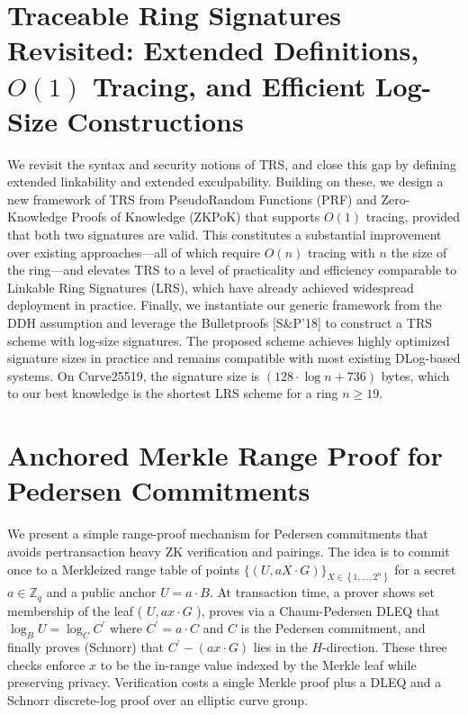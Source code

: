 \documentclass[11pt,oneside]{book}
\theoremstyle{definition}
\theoremstyle{remark}
\theoremstyle{plain}
\begin{document}
\section{\cite{cryptoeprint:2025/1807} Traceable Ring Signatures Revisited: Extended Definitions, $O(1)$ Tracing, and Efficient Log-Size Constructions}
We revisit the syntax and security notions of TRS, and close this gap by defining extended linkability and extended exculpability. Building on these, we design a new framework of TRS from PseudoRandom Functions (PRF) and Zero-Knowledge Proofs of Knowledge (ZKPoK) that supports $O(1)$ tracing, provided that both two signatures are valid. This constitutes a substantial improvement over existing approaches---all of which require $O(n)$ tracing with $n$ the size of the ring---and elevates TRS to a level of practicality and efficiency comparable to Linkable Ring Signatures (LRS), which have already achieved widespread deployment in practice. Finally, we instantiate our generic framework from the DDH assumption and leverage the Bulletproofs [S\&P'18] to construct a TRS scheme with log-size signatures. The proposed scheme achieves highly optimized signature sizes in practice and remains compatible with most existing DLog-based systems. On Curve25519, the signature size is $(128 \cdot \log n + 736)$ bytes, which to our best knowledge is the shortest LRS scheme for a ring $n \ge 19$.

\section{\cite{cryptoeprint:2025/1811} Anchored Merkle Range Proof for Pedersen Commitments}
We present a simple range-proof mechanism for Pedersen commitments that avoids pertransaction heavy ZK verification and pairings. The idea is to commit once to a Merkleized range table of points $\{(U, a X \cdot G)\}_{X \in\left\{1, \ldots, 2^n\right\}}$ for a secret $a \in \mathbb{Z}_q$ and a public anchor $U=a \cdot B$. At transaction time, a prover shows set membership of the leaf ( $U, a x \cdot G$ ), proves via a Chaum-Pedersen DLEQ that $\log _B U=\log _C C^{\prime}$ where $C^{\prime}=a \cdot C$ and $C$ is the Pedersen commitment, and finally proves (Schnorr) that $C^{\prime}-(a x \cdot G)$ lies in the $H$-direction. These three checks enforce $x$ to be the in-range value indexed by the Merkle leaf while preserving privacy. Verification costs a single Merkle proof plus a DLEQ and a Schnorr discrete-log proof over an elliptic curve group.
\end{document}
